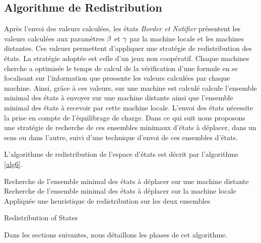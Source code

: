 \subsection{Algorithme de Redistribution }
 
Après l'envoi des valeurs calculées, les états \emph{Border et Notifier} présentent les valeurs calculées aux paramètres $\beta{}$ et $\gamma{}$ par la machine locale et les machines distantes. Ces valeurs permettent d'appliquer une stratégie de redistribution des états. La stratégie adoptée est celle d'un jeux non coopératif. Chaque machines cherche a optimisée le temps de calcul de la vérification d'une formule en se focalisant sur l'information que pressente les valeurs calculées par chaque machine. Ainsi, grâce à ces valeurs, sur une machine est calculé calcule l'ensemble minimal des états à envoyer sur une machine distante ainsi que l'ensemble minimal des états à recevoir par cette machine locale. L'envoi des états nécessite la prise en compte de l'équilibrage de charge.  
Dans ce qui suit nous proposons une stratégie de recherche de ces ensembles minimaux d'états à déplacer, dans un sens ou dans l'autre, suivi d'une technique d'envoi de ces ensembles d'états.

L'algorithme de redistribution de l'espace d'états est décrit par l'algorithme \ref{alg6}.\\
\begin{algorithm}[H]
	\SetAlgoLined
	Recherche de l'ensemble minimal des états à déplacer sur une machine distante\; 
	Recherche de l'ensemble minimal des états à déplacer sur la machine locale\; 
	Appliquée une heuristique de redistribution sur les deux ensembles\;
	\caption{Redistribution of States}\label{alg6}
\end{algorithm}
Dans les sections suivantes, nous détaillons les phases de cet algorithme.

